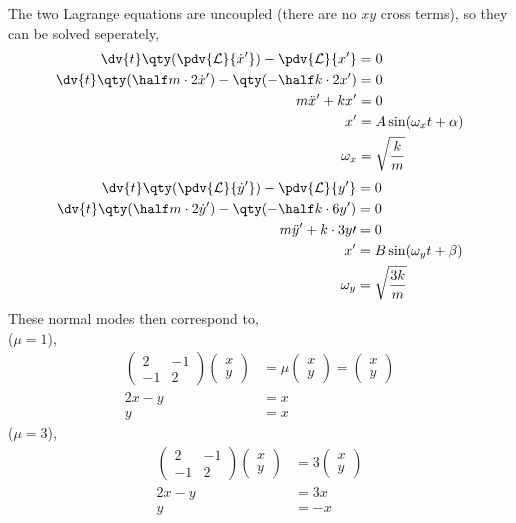 \begin{example}
The two Lagrange equations are uncoupled (there are no $xy$ cross
terms), so they can be solved seperately,
\begin{align*}
  \dv{t} \qty( \pdv{{\cal L}}{\dot{x}^{\prime}} ) - \pdv{{\cal L}}{x^{\prime}} &= 0 \\
\dv{t} \qty( \half m \cdot 2 \dot{x}^{\prime} ) - \qty( - \half k \cdot 2 x^{\prime} ) &= 0 \\
m \ddot{x}^{\prime} + k x^{\prime} &= 0 \\
x^{\prime} &= A \sin(\omega_x t + \alpha) \\
\omega_x &= \sqrt{\frac{k}{m}}
\end{align*}
\begin{align*}
  \dv{t} \qty( \pdv{{\cal L}}{\dot{y}^{\prime}} ) - \pdv{{\cal L}}{y^{\prime}} &= 0 \\
\dv{t} \qty( \half m \cdot 2 \dot{y}^{\prime} ) - \qty( - \half k \cdot 6 y^{\prime} ) &= 0 \\
m \ddot{y}^{\prime} + k \cdot 3y{\prime} &= 0 \\
x^{\prime} &= B \sin(\omega_y t + \beta) \\
\omega_y &= \sqrt{\frac{3k}{m}}
\end{align*}
These normal modes then correspond to,\\
($\mu=1$), 
\begin{align*}
  \begin{pmatrix}    2 & -1 \\ -1 & 2  \end{pmatrix}
  \begin{pmatrix} x \\ y \end{pmatrix}
  &= \mu
  \begin{pmatrix} x \\ y \end{pmatrix} 
  =
  \begin{pmatrix} x \\ y \end{pmatrix} \\
  2x - y &= x \\
  y &= x
\end{align*}
($\mu=3$),
\begin{align*}
  \begin{pmatrix}2 & -1 \\ -1 & 2 \end{pmatrix}
  \begin{pmatrix}  x \\ y         \end{pmatrix}
  &= 3
  \begin{pmatrix} x \\ y \end{pmatrix} \\
  2x - y &= 3x \\
  y &= -x
\end{align*}
  \end{example}
